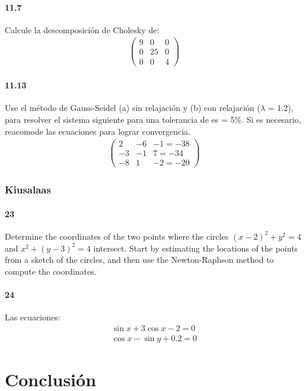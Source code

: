 \documentclass[12pt,oneside,FLEQN]{report}
\begin{document}
{			\subsubsection{11.7}
			Calcule la descomposición de Cholesky de:
			\begin{align}
                                \begin{pmatrix}
                                        9&0&0\\
                                        0&25&0\\
                                        0&0&4
                                \end{pmatrix}
                        \end{align}
			\subsubsection{11.13}
			Use el método de Gauss-Seidel (a) sin relajación y (b) con relajación ($\lambda$ = 1.2), para resolver el sistema siguiente para una tolerancia de es = 5\%. Si es necesario, reacomode las ecuaciones para lograr convergencia.
		\begin{align}
                                \begin{pmatrix}
                                        2&-6&-1=-38\\
                                        -3&-1&7=-34\\
                                        -8&1&-2=-20
                                \end{pmatrix}
                        \end{align}
		\subsection{Kiusalaas}
			\subsubsection{23}
			Determine the coordinates of the two points where the circles $(x − 2)^2 + y^2 = 4$ and $x^2 + (y − 3)^2 = 4$ intersect. Start by estimating the locations of the points from a sketch of the circles, and then use the Newton-Raphson method to compute the coordinates.
			\subsubsection{24}
			Las ecuaciones:
			\begin{align}
				\sin{x}+3\cos{x}-2=0\\
				\cos{x}-\sin{y}+0.2=0
			\end{align}
\chapter{Conclusión}

}
\end{document}
